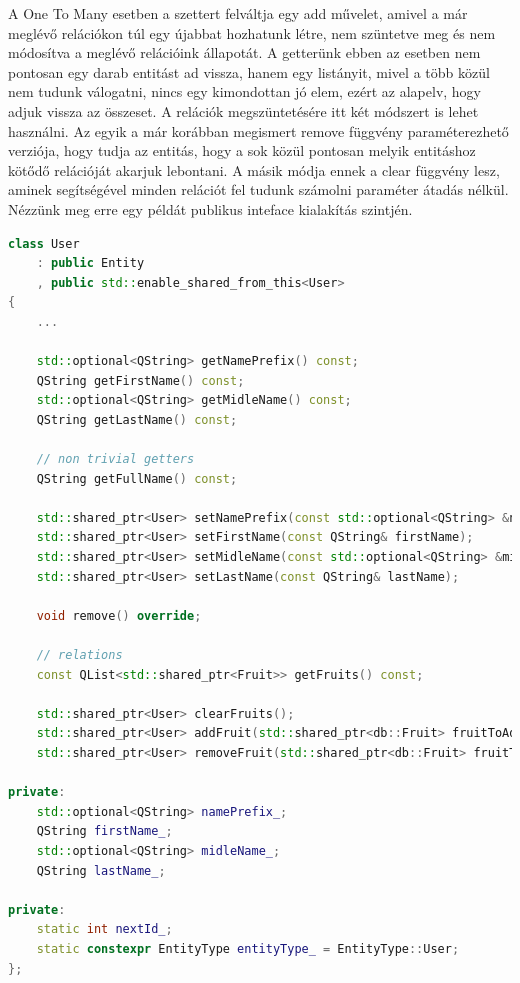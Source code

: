 A One To Many esetben a szettert felváltja egy add művelet, amivel a már meglévő relációkon túl egy újabbat hozhatunk létre, nem szüntetve meg és nem módosítva a meglévő relációink állapotát. A getterünk ebben az esetben nem pontosan egy darab entitást ad vissza, hanem egy listányit, mivel a több közül nem tudunk válogatni, nincs egy kimondottan jó elem, ezért az alapelv, hogy adjuk vissza az összeset. A relációk megszüntetésére itt két módszert is lehet használni. Az egyik a már korábban megismert remove függvény paraméterezhető verziója, hogy tudja az entitás, hogy a sok közül pontosan melyik entitáshoz kötődő relációját akarjuk lebontani. A másik módja ennek a clear függvény lesz, aminek segítségével minden relációt fel tudunk számolni paraméter átadás nélkül. Nézzünk meg erre egy példát publikus inteface kialakítás szintjén.

\begin{lstlisting}[language={C++}]
class User
    : public Entity
    , public std::enable_shared_from_this<User>
{
    ...
    
    std::optional<QString> getNamePrefix() const;
    QString getFirstName() const;
    std::optional<QString> getMidleName() const;
    QString getLastName() const;

    // non trivial getters
    QString getFullName() const;

    std::shared_ptr<User> setNamePrefix(const std::optional<QString> &namePrefix);
    std::shared_ptr<User> setFirstName(const QString& firstName);
    std::shared_ptr<User> setMidleName(const std::optional<QString> &midleName);
    std::shared_ptr<User> setLastName(const QString& lastName);

    void remove() override;

    // relations
    const QList<std::shared_ptr<Fruit>> getFruits() const;

    std::shared_ptr<User> clearFruits();
    std::shared_ptr<User> addFruit(std::shared_ptr<db::Fruit> fruitToAdd);
    std::shared_ptr<User> removeFruit(std::shared_ptr<db::Fruit> fruitToRemove);

private:
    std::optional<QString> namePrefix_;
    QString firstName_;
    std::optional<QString> midleName_;
    QString lastName_;

private:
    static int nextId_;
    static constexpr EntityType entityType_ = EntityType::User;
};
\end{lstlisting}

